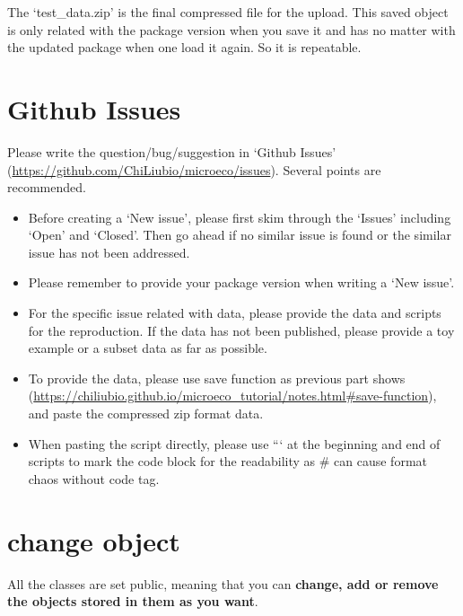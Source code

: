 \documentclass[
]{book}
\newenvironment{Shaded}{\begin{snugshade}}{\end{snugshade}}
\newcommand{\AttributeTok}[1]{\textcolor[rgb]{0.77,0.63,0.00}{#1}}
\newcommand{\CommentTok}[1]{\textcolor[rgb]{0.56,0.35,0.01}{\textit{#1}}}
\newcommand{\DecValTok}[1]{\textcolor[rgb]{0.00,0.00,0.81}{#1}}
\newcommand{\FunctionTok}[1]{\textcolor[rgb]{0.00,0.00,0.00}{#1}}
\newcommand{\NormalTok}[1]{#1}
\newcommand{\OtherTok}[1]{\textcolor[rgb]{0.56,0.35,0.01}{#1}}
\newcommand{\SpecialCharTok}[1]{\textcolor[rgb]{0.00,0.00,0.00}{#1}}
\begin{document}
The `test\_data.zip' is the final compressed file for the upload.
This saved object is only related with the package version when you save it and has no matter with the updated package when one load it again.
So it is repeatable.

\hypertarget{github-issues}{%
\section{Github Issues}\label{github-issues}}

Please write the question/bug/suggestion in `Github Issues' (\url{https://github.com/ChiLiubio/microeco/issues}).
Several points are recommended.

\begin{itemize}
\item
  Before creating a `New issue', please first skim through the `Issues' including `Open' and `Closed'.
  Then go ahead if no similar issue is found or the similar issue has not been addressed.
\item
  Please remember to provide your package version when writing a `New issue'.
\item
  For the specific issue related with data, please provide the data and scripts for the reproduction.
  If the data has not been published, please provide a toy example or a subset data as far as possible.
\item
  To provide the data, please use save function as previous part shows (\url{https://chiliubio.github.io/microeco_tutorial/notes.html\#save-function}),
  and paste the compressed zip format data.
\item
  When pasting the script directly, please use ``` at the beginning and end of scripts to mark the code block for the readability
  as \# can cause format chaos without code tag.
\end{itemize}

\hypertarget{change-object}{%
\section{change object}\label{change-object}}

All the classes are set public, meaning that you can \textbf{change, add or remove the objects stored in them as you want}.

\begin{Shaded}
\end{Shaded}
\end{document}
